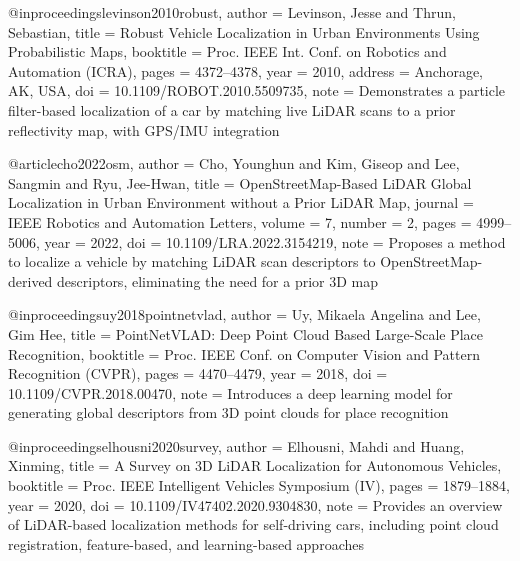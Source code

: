 @inproceedings{levinson2010robust,
  author = {Levinson, Jesse and Thrun, Sebastian},
  title = {Robust Vehicle Localization in Urban Environments Using Probabilistic Maps},
  booktitle = {Proc. IEEE Int. Conf. on Robotics and Automation (ICRA)},
  pages = {4372--4378},
  year = {2010},
  address = {Anchorage, AK, USA},
  doi = {10.1109/ROBOT.2010.5509735},
  note = {Demonstrates a particle filter-based localization of a car by matching live LiDAR scans to a prior reflectivity map, with GPS/IMU integration}
}

@article{cho2022osm,
  author = {Cho, Younghun and Kim, Giseop and Lee, Sangmin and Ryu, Jee-Hwan},
  title = {OpenStreetMap-Based LiDAR Global Localization in Urban Environment without a Prior LiDAR Map},
  journal = {IEEE Robotics and Automation Letters},
  volume = {7},
  number = {2},
  pages = {4999--5006},
  year = {2022},
  doi = {10.1109/LRA.2022.3154219},
  note = {Proposes a method to localize a vehicle by matching LiDAR scan descriptors to OpenStreetMap-derived descriptors, eliminating the need for a prior 3D map}
}

@inproceedings{uy2018pointnetvlad,
  author = {Uy, Mikaela Angelina and Lee, Gim Hee},
  title = {PointNetVLAD: Deep Point Cloud Based Large-Scale Place Recognition},
  booktitle = {Proc. IEEE Conf. on Computer Vision and Pattern Recognition (CVPR)},
  pages = {4470--4479},
  year = {2018},
  doi = {10.1109/CVPR.2018.00470},
  note = {Introduces a deep learning model for generating global descriptors from 3D point clouds for place recognition}
}

@inproceedings{elhousni2020survey,
  author = {Elhousni, Mahdi and Huang, Xinming},
  title = {A Survey on 3D LiDAR Localization for Autonomous Vehicles},
  booktitle = {Proc. IEEE Intelligent Vehicles Symposium (IV)},
  pages = {1879--1884},
  year = {2020},
  doi = {10.1109/IV47402.2020.9304830},
  note = {Provides an overview of LiDAR-based localization methods for self-driving cars, including point cloud registration, feature-based, and learning-based approaches}
}
